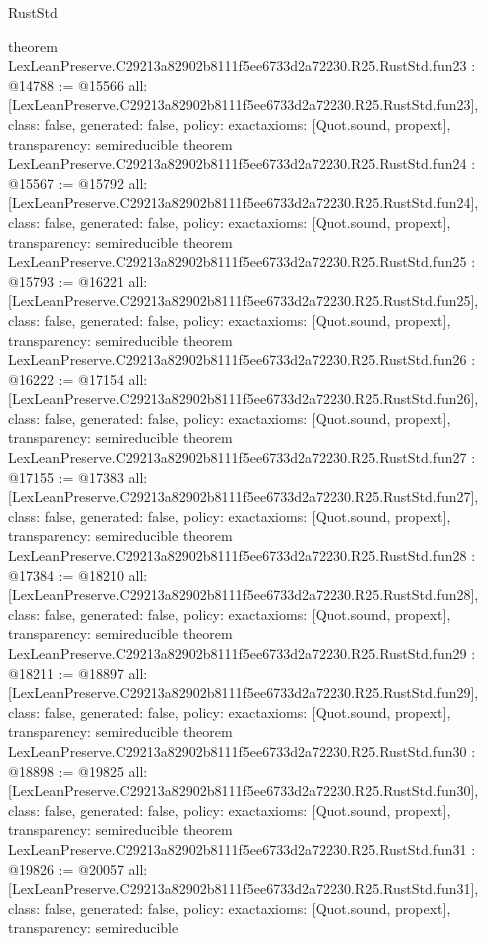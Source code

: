 \begin{lexlean}{RustStd}
\begin{coremodule}
{}
theorem LexLeanPreserve.C29213a82902b8111f5ee6733d2a72230.R25.RustStd.fun23 : @14788 := @15566 {
  all: [LexLeanPreserve.C29213a82902b8111f5ee6733d2a72230.R25.RustStd.fun23],
  class: false,
  generated: false,
  policy: exact{axioms: [Quot.sound, propext]},
  transparency: semireducible
}
theorem LexLeanPreserve.C29213a82902b8111f5ee6733d2a72230.R25.RustStd.fun24 : @15567 := @15792 {
  all: [LexLeanPreserve.C29213a82902b8111f5ee6733d2a72230.R25.RustStd.fun24],
  class: false,
  generated: false,
  policy: exact{axioms: [Quot.sound, propext]},
  transparency: semireducible
}
theorem LexLeanPreserve.C29213a82902b8111f5ee6733d2a72230.R25.RustStd.fun25 : @15793 := @16221 {
  all: [LexLeanPreserve.C29213a82902b8111f5ee6733d2a72230.R25.RustStd.fun25],
  class: false,
  generated: false,
  policy: exact{axioms: [Quot.sound, propext]},
  transparency: semireducible
}
theorem LexLeanPreserve.C29213a82902b8111f5ee6733d2a72230.R25.RustStd.fun26 : @16222 := @17154 {
  all: [LexLeanPreserve.C29213a82902b8111f5ee6733d2a72230.R25.RustStd.fun26],
  class: false,
  generated: false,
  policy: exact{axioms: [Quot.sound, propext]},
  transparency: semireducible
}
theorem LexLeanPreserve.C29213a82902b8111f5ee6733d2a72230.R25.RustStd.fun27 : @17155 := @17383 {
  all: [LexLeanPreserve.C29213a82902b8111f5ee6733d2a72230.R25.RustStd.fun27],
  class: false,
  generated: false,
  policy: exact{axioms: [Quot.sound, propext]},
  transparency: semireducible
}
theorem LexLeanPreserve.C29213a82902b8111f5ee6733d2a72230.R25.RustStd.fun28 : @17384 := @18210 {
  all: [LexLeanPreserve.C29213a82902b8111f5ee6733d2a72230.R25.RustStd.fun28],
  class: false,
  generated: false,
  policy: exact{axioms: [Quot.sound, propext]},
  transparency: semireducible
}
theorem LexLeanPreserve.C29213a82902b8111f5ee6733d2a72230.R25.RustStd.fun29 : @18211 := @18897 {
  all: [LexLeanPreserve.C29213a82902b8111f5ee6733d2a72230.R25.RustStd.fun29],
  class: false,
  generated: false,
  policy: exact{axioms: [Quot.sound, propext]},
  transparency: semireducible
}
theorem LexLeanPreserve.C29213a82902b8111f5ee6733d2a72230.R25.RustStd.fun30 : @18898 := @19825 {
  all: [LexLeanPreserve.C29213a82902b8111f5ee6733d2a72230.R25.RustStd.fun30],
  class: false,
  generated: false,
  policy: exact{axioms: [Quot.sound, propext]},
  transparency: semireducible
}
theorem LexLeanPreserve.C29213a82902b8111f5ee6733d2a72230.R25.RustStd.fun31 : @19826 := @20057 {
  all: [LexLeanPreserve.C29213a82902b8111f5ee6733d2a72230.R25.RustStd.fun31],
  class: false,
  generated: false,
  policy: exact{axioms: [Quot.sound, propext]},
  transparency: semireducible
}
\end{coremodule}
\end{lexlean}
